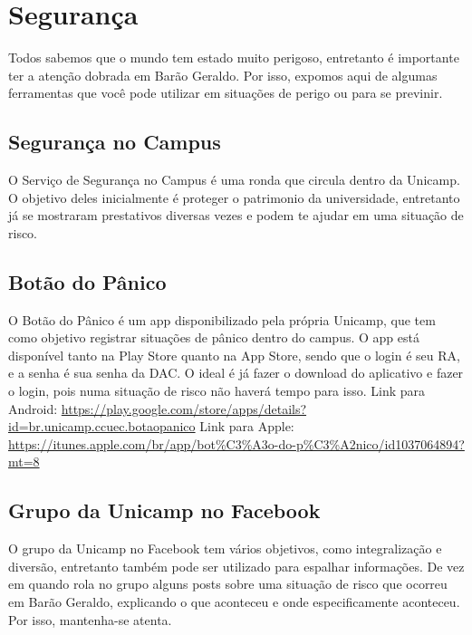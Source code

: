 
\section{Segurança}

Todos sabemos que o mundo tem estado muito perigoso, entretanto é importante ter a atenção dobrada em Barão Geraldo. Por isso, expomos aqui de algumas ferramentas que você pode utilizar em situações de perigo ou para se previnir.

\subsection{Segurança no Campus}

O Serviço de Segurança no Campus é uma ronda que circula dentro da Unicamp. O objetivo deles inicialmente é proteger o patrimonio da universidade, entretanto já se mostraram prestativos diversas vezes e podem te ajudar em uma situação de risco.

\subsection{Botão do Pânico}

O Botão do Pânico é um app disponibilizado pela própria Unicamp, que tem como objetivo registrar situações de pânico dentro do campus. O app está disponível tanto na Play Store quanto na App Store, sendo que o login é seu RA, e a senha é sua senha da DAC. O ideal é já fazer o download do aplicativo e fazer o login, pois numa situação de risco não haverá tempo para isso.
Link para Android: \url{https://play.google.com/store/apps/details?id=br.unicamp.ccuec.botaopanico}
Link para Apple: \url{https://itunes.apple.com/br/app/bot%C3%A3o-do-p%C3%A2nico/id1037064894?mt=8}

\subsection{Grupo da Unicamp no Facebook}

O grupo da Unicamp no Facebook tem vários objetivos, como integralização e diversão, entretanto também pode ser utilizado para espalhar informações. De vez em quando rola no grupo alguns posts sobre uma situação de risco que ocorreu em Barão Geraldo, explicando o que aconteceu e onde especificamente aconteceu. Por isso, mantenha-se atenta.
